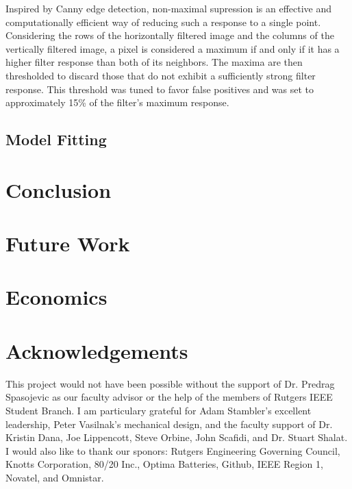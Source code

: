 \documentclass[11pt,twocolumn]{article}
\begin{document}
Inspired by Canny edge detection, non-maximal supression is an effective and
computationally efficient way of reducing such a response to a single point.
Considering the rows of the horizontally filtered image and the columns of the
vertically filtered image, a pixel is considered a maximum if and only if it
has a higher filter response than both of its neighbors. The maxima are then
thresholded to discard those that do not exhibit a sufficiently strong filter
response. This threshold was tuned to favor false positives and was set to
approximately 15\% of the filter's maximum response.


\subsection{Model Fitting}
\label{sec:line-model}


\section{Conclusion}
\label{sec:conclusion}

\section{Future Work}
\label{sec:future}

\section{Economics}
\label{sec:econ}

\section{Acknowledgements}
This project would not have been possible without the support of Dr. Predrag
Spasojevic as our faculty advisor or the help of the members of Rutgers IEEE
Student Branch. I am particulary grateful for Adam Stambler's excellent
leadership, Peter Vasilnak's mechanical design, and the faculty support of Dr.
Kristin Dana, Joe Lippencott, Steve Orbine, John Scafidi, and Dr. Stuart
Shalat. I would also like to thank our sponors: Rutgers Engineering Governing
Council, Knotts Corporation, 80/20 Inc., Optima Batteries, Github, IEEE Region
1, Novatel, and Omnistar.
\end{document}

